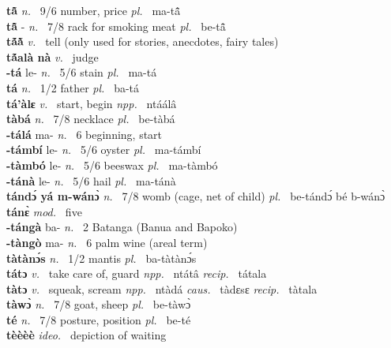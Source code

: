 \noindent
{\bfseries tã̂}  {\itshape n.~} 9/6 number, price {\itshape pl.~} ma-tã̂    \\ 
{\bfseries tã̂} - {\itshape n.~} 7/8 rack for smoking meat {\itshape pl.~} be-tã̂    \\ 
{\bfseries tã́ã̀}  {\itshape v.~} tell (only used for stories, anecdotes, fairy tales)    \\ 
{\bfseries tã́alà nà}  {\itshape v.~} judge    \\ 
{\bfseries -tá} le- {\itshape n.~} 5/6 stain {\itshape pl.~} ma-tá    \\ 
{\bfseries tá}  {\itshape n.~} 1/2 father {\itshape pl.~} ba-tá    \\ 
{\bfseries tá'àlɛ}  {\itshape v.~} start, begin    {\itshape npp.~} ntáálâ  \\ 
{\bfseries tàbá}  {\itshape n.~} 7/8 necklace {\itshape pl.~} be-tàbá    \\ 
{\bfseries -tálá} ma- {\itshape n.~} 6 beginning, start    \\ 
{\bfseries -támbí} le- {\itshape n.~} 5/6 oyster {\itshape pl.~} ma-támbí    \\ 
{\bfseries -tàmbó} le- {\itshape n.~} 5/6 beeswax {\itshape pl.~} ma-tàmbó    \\ 
{\bfseries -tánà} le- {\itshape n.~} 5/6 hail {\itshape pl.~} ma-tánà    \\ 
{\bfseries tándɔ́ yá m-wánɔ̀}  {\itshape n.~} 7/8 womb (cage, net of child) {\itshape pl.~} be-tándɔ́ bé b-wánɔ̀    \\ 
{\bfseries tánɛ̀}  {\itshape mod.~} five    \\ 
{\bfseries -tángà} ba- {\itshape n.~} 2 Batanga (Banua and Bapoko)    \\ 
{\bfseries -tàngò} ma- {\itshape n.~} 6 palm wine (areal term)    \\ 
{\bfseries tàtànɔ́s}  {\itshape n.~} 1/2 mantis {\itshape pl.~} ba-tàtànɔ́s    \\ 
{\bfseries tátɔ}  {\itshape v.~} take care of, guard   {\itshape npp.~} ntátâ {\itshape recip.~} tátala  \\ 
{\bfseries tàtɔ}  {\itshape v.~} squeak, scream   {\itshape npp.~} ntàdá {\itshape caus.~} tàdɛsɛ {\itshape recip.~} tàtala  \\ 
{\bfseries tàwɔ̀}  {\itshape n.~} 7/8 goat, sheep {\itshape pl.~} be-tàwɔ̀    \\ 
{\bfseries té}  {\itshape n.~} 7/8 posture, position {\itshape pl.~} be-té    \\ 
{\bfseries tèèèè}  {\itshape ideo.~} depiction of waiting    \\ 
